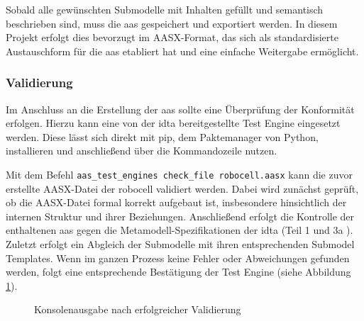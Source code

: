 Sobald alle gewünschten Submodelle mit Inhalten gefüllt und semantisch beschrieben sind, muss die \acs{aas} gespeichert und exportiert werden.
In diesem Projekt erfolgt dies bevorzugt im AASX-Format, das sich als standardisierte Austauschform für die \acs{aas} etabliert hat und eine einfache Weitergabe ermöglicht.


\subsubsection{Validierung}
Im Anschluss an die Erstellung der \acs{aas} sollte eine Überprüfung der Konformität erfolgen.
Hierzu kann eine von der \acs{idta} bereitgestellte Test Engine \cite{TestEngine} eingesetzt werden. 
Diese lässt sich direkt mit pip, dem Paktemanager von Python, installieren und anschließend über die Kommandozeile nutzen.

Mit dem Befehl \texttt{aas\_test\_engines check\_file robocell.aasx} kann die zuvor erstellte AASX-Datei der robocell validiert werden.
Dabei wird zunächst geprüft, ob die AASX-Datei formal korrekt aufgebaut ist, insbesondere hinsichtlich der internen Struktur und ihrer Beziehungen.
Anschließend erfolgt die Kontrolle der enthaltenen \acs{aas} gegen die Metamodell-Spezifikationen der \acs{idta} (Teil 1 \cite{SpezifikationPart1} und 3a \cite{SpezifikationPart3a}).
Zuletzt erfolgt ein Abgleich der Submodelle mit ihren entsprechenden Submodel Templates.
Wenn im ganzen Prozess keine Fehler oder Abweichungen gefunden werden, folgt eine entsprechende Bestätigung der Test Engine (siehe Abbildung \ref{fig:KonsolenausgabeTestEngine}).

\setlength{\fboxsep}{0pt}
\begin{figure}[htbp]
    \centering
    \caption{Konsolenausgabe nach erfolgreicher Validierung}
    \label{fig:KonsolenausgabeTestEngine}
\end{figure}

